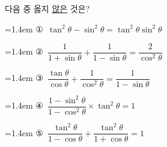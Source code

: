 다음 중 옳지 \underline{않은} 것은?
\par\medskip\par\noindent\hangindent=1.4em {\small ①}\ $\tan^2\theta-\sin^2\theta=\tan^2\theta\sin^2\theta$\par\noindent\hangindent=1.4em {\small ②}\ $\dfrac{1}{1+\sin\theta}+\dfrac{1}{1-\sin\theta}=\dfrac{2}{\cos^2\theta}$\par\noindent\hangindent=1.4em {\small ③}\ $\dfrac{\tan\theta}{\cos\theta}+\dfrac{1}{\cos^2\theta}=\dfrac{1}{1-\sin\theta}$\par\noindent\hangindent=1.4em {\small ④}\ $\dfrac{1-\sin^2\theta}{1-\cos^2\theta}\times\tan^2\theta=1$\par\noindent\hangindent=1.4em {\small ⑤}\ $\dfrac{\tan^2\theta}{1-\cos\theta}+\dfrac{\tan^2\theta}{1+\cos\theta}=1$\par\medskip
